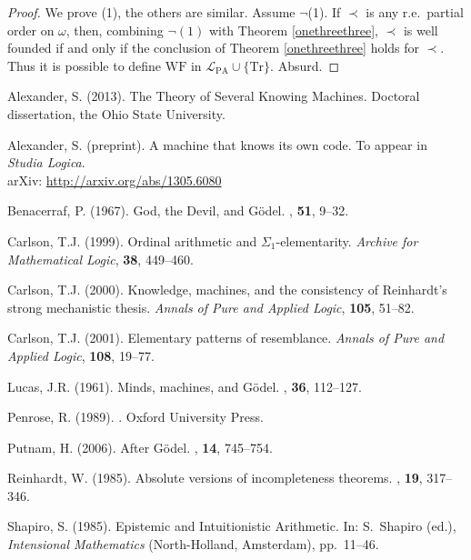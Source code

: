 \documentclass[reqno]{article}
\theoremstyle{definition}
\def\L{\mathscr{L}}
\def\LPA{\L_{\mathrm{PA}}}
\def\Tr{\mathrm{Tr}}
\begin{document}
\begin{proof}
We prove (1), the others are similar.
Assume $\neg$(1).  If $\prec$ is any r.e.~partial order on $\omega$,
then, combining $\neg(1)$ with Theorem \ref{onethreethree},
$\prec$ is well founded if and only if the conclusion of Theorem \ref{onethreethree} holds for $\prec$.
Thus it is possible to define $\mathrm{WF}$ in $\LPA\cup\{\Tr\}$.
Absurd.
\end{proof}


\begin{thebibliography}{99}

Alexander, S. (2013).
The Theory of Several Knowing Machines.  Doctoral dissertation, the Ohio State University.

Alexander, S. (preprint).
A machine that knows its own code.  To appear in \emph{Studia Logica}.\\
arXiv: \url{http://arxiv.org/abs/1305.6080}

Benacerraf, P. (1967).
\newblock God, the Devil, and G\"{o}del.
, \textbf{51}, 9--32.

Carlson, T.J. (1999).  Ordinal arithmetic and $\Sigma_1$-elementarity.
\emph{Archive for Mathematical Logic}, \textbf{38}, 449--460.

Carlson, T.J. (2000). Knowledge, machines, and the consistency of Reinhardt's strong mechanistic thesis.
\hspace{-2pt}\emph{Annals of Pure and Applied Logic}, \textbf{105}, 51--82.

Carlson, T.J. (2001).  Elementary patterns of resemblance.
\emph{Annals of Pure and Applied Logic}, \textbf{108}, 19--77.

Lucas, J.R. (1961).
\newblock Minds, machines, and G\"{o}del.
, \textbf{36}, 112--127.

Penrose, R. (1989).
. Oxford University Press.

Putnam, H. (2006).
\newblock After G\"{o}del.
, \textbf{14}, 745--754.

Reinhardt, W. (1985).
\newblock Absolute versions of incompleteness theorems.
, \textbf{19}, 317--346.

%
%

Shapiro, S. (1985).  Epistemic and Intuitionistic Arithmetic.  In: S.~Shapiro (ed.), \emph{Intensional Mathematics} (North-Holland, Amsterdam),
pp.~11--46.

\end{thebibliography}
\end{document}
